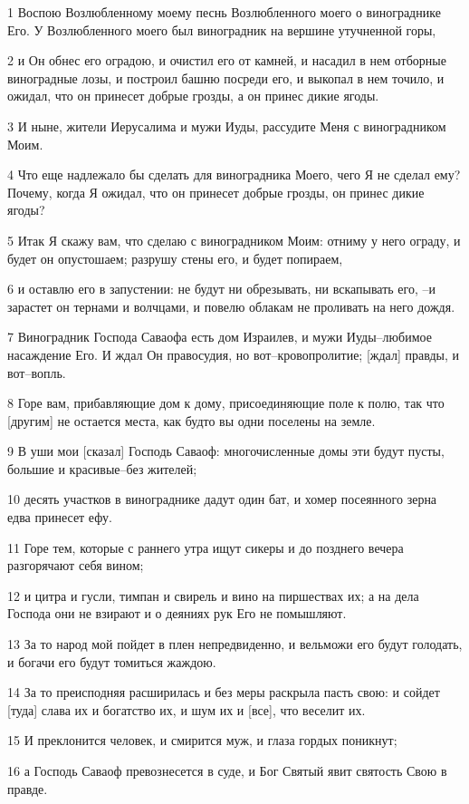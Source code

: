 \par 1 Воспою Возлюбленному моему песнь Возлюбленного моего о винограднике Его. У Возлюбленного моего был виноградник на вершине утучненной горы,
\par 2 и Он обнес его оградою, и очистил его от камней, и насадил в нем отборные виноградные лозы, и построил башню посреди его, и выкопал в нем точило, и ожидал, что он принесет добрые грозды, а он принес дикие ягоды.
\par 3 И ныне, жители Иерусалима и мужи Иуды, рассудите Меня с виноградником Моим.
\par 4 Что еще надлежало бы сделать для виноградника Моего, чего Я не сделал ему? Почему, когда Я ожидал, что он принесет добрые грозды, он принес дикие ягоды?
\par 5 Итак Я скажу вам, что сделаю с виноградником Моим: отниму у него ограду, и будет он опустошаем; разрушу стены его, и будет попираем,
\par 6 и оставлю его в запустении: не будут ни обрезывать, ни вскапывать его, --и зарастет он тернами и волчцами, и повелю облакам не проливать на него дождя.
\par 7 Виноградник Господа Саваофа есть дом Израилев, и мужи Иуды--любимое насаждение Его. И ждал Он правосудия, но вот--кровопролитие; [ждал] правды, и вот--вопль.
\par 8 Горе вам, прибавляющие дом к дому, присоединяющие поле к полю, так что [другим] не остается места, как будто вы одни поселены на земле.
\par 9 В уши мои [сказал] Господь Саваоф: многочисленные домы эти будут пусты, большие и красивые--без жителей;
\par 10 десять участков в винограднике дадут один бат, и хомер посеянного зерна едва принесет ефу.
\par 11 Горе тем, которые с раннего утра ищут сикеры и до позднего вечера разгорячают себя вином;
\par 12 и цитра и гусли, тимпан и свирель и вино на пиршествах их; а на дела Господа они не взирают и о деяниях рук Его не помышляют.
\par 13 За то народ мой пойдет в плен непредвиденно, и вельможи его будут голодать, и богачи его будут томиться жаждою.
\par 14 За то преисподняя расширилась и без меры раскрыла пасть свою: и сойдет [туда] слава их и богатство их, и шум их и [все], что веселит их.
\par 15 И преклонится человек, и смирится муж, и глаза гордых поникнут;
\par 16 а Господь Саваоф превознесется в суде, и Бог Святый явит святость Свою в правде.
